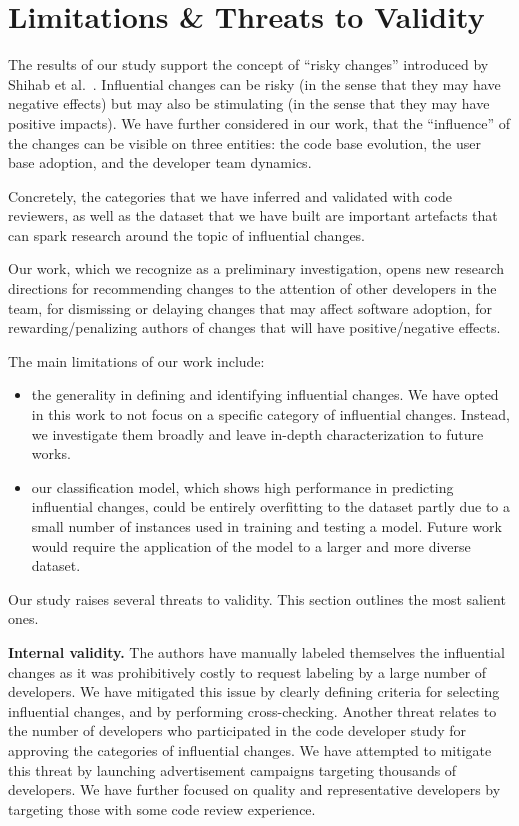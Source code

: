 \section{Limitations \& Threats to Validity}
\label{sec:discussion}

The results of our study support the concept of ``risky changes'' introduced by Shihab et al.~\cite{shihab_industrial_2012}.
Influential changes can be risky (in the sense that they may have negative effects) but may also be stimulating (in the sense that
they may have positive impacts). We have further considered in our work, that the ``influence'' of the changes can be
visible on three entities: the code base evolution, the user base adoption, and the developer team dynamics.

Concretely, the categories that we have inferred and validated with code reviewers, as well as the dataset that
we have built are important artefacts that can spark research around the topic of influential changes.

Our work, which we recognize as a preliminary investigation, opens new research directions for
recommending changes to the attention of other developers in the team, for dismissing or delaying changes that may
affect software adoption, for rewarding/penalizing authors of changes that will have positive/negative effects.

The main limitations of our work include:
\begin{itemize}
	\item the generality in defining and identifying influential changes. We have opted in this work to not focus on a specific category of influential changes. Instead, we investigate them broadly and leave in-depth characterization to future works.
	\item our classification model, which shows high performance in predicting influential changes, could be entirely overfitting to the dataset partly due to a small number of instances used in training and testing a model. Future work would require the application of the model to a larger and more diverse dataset.
\end{itemize}

Our study raises several threats to validity. This section outlines the most salient ones.

\textbf{Internal validity.} The authors have manually labeled themselves the influential changes as it
was prohibitively costly to request labeling by a large number of developers. We have mitigated this issue
by clearly defining criteria for selecting influential changes, and by performing cross-checking.
Another threat relates to the number of developers who participated in the code developer study for
approving the categories of influential changes. We have attempted to mitigate this threat by launching
advertisement campaigns targeting thousands of developers. We have further focused on quality and representative 
developers by targeting those with some code review experience.

